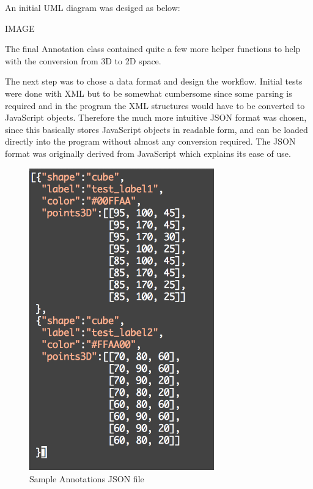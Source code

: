 \documentclass[a4paper,11pt,titlepage]{article}
\begin{document}
An initial UML diagram was desiged as below:

IMAGE




The final Annotation class contained quite a few more helper functions to help with the conversion from 3D to 2D space.


The next step was to chose a data format and design the workflow. Initial tests were done with XML but to be somewhat cumbersome since some parsing is required and in the program the XML structures would have to be converted to JavaScript objects. Therefore the much more intuitive JSON format was chosen, since this basically stores JavaScript objects in readable form, and can be loaded directly into the program without almost any conversion required. The JSON format was originally derived from JavaScript which explains its ease of use.

\begin{figure}[ht!]
\centering
\includegraphics[width=80mm]{graphics/AnnoJSON_01.png}
\caption{Sample Annotations JSON file}
\label{fig:UIdesign1}
\end{figure}
\end{document}
